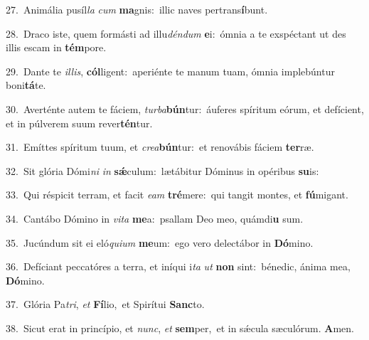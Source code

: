 {\numbfont\textcolor{\numbcolor}{27.}}~Animália pusíl\textit{la} \textit{cum} \textbf{ma}\-gnis:~\star illic naves pertrans\-\textbf{í}\-bunt.\par
{\numbfont\textcolor{\numbcolor}{28.}}~Draco iste, quem formásti ad illu\-\textit{dén}\-\textit{dum} \textbf{e}\-i:~\star ómnia a te exspéctant ut des illis escam in \textbf{tém}\-pore.\par
{\numbfont\textcolor{\numbcolor}{29.}}~Dante te \textit{il}\-\textit{lis}, \textbf{cól}\-ligent:~\star aperiénte te manum tuam, ómnia implebúntur boni\-\textbf{tá}\-te.\par
{\numbfont\textcolor{\numbcolor}{30.}}~Averténte autem te fáciem, \textit{tur}\-\textit{ba}\textbf{bún}tur:~\star áuferes spíritum eórum, et defícient, et in púlverem suum rever\-\textbf{tén}\-tur.\par
{\numbfont\textcolor{\numbcolor}{31.}}~Emíttes spíritum tuum, et \textit{cre}\-\textit{a}\textbf{bún}tur:~\star et renovábis fáciem \textbf{ter}\-ræ.\par
{\numbfont\textcolor{\numbcolor}{32.}}~Sit glória Dómi\textit{ni} \textit{in} \textbf{sǽ}\-culum:~\star lætábitur Dóminus in opéribus \textbf{su}\-is:\par
{\numbfont\textcolor{\numbcolor}{33.}}~Qui réspicit terram, et facit \textit{e}\-\textit{am} \textbf{tré}\-mere:~\star qui tangit montes, et \textbf{fú}\-migant.\par
{\numbfont\textcolor{\numbcolor}{34.}}~Cantábo Dómino in \textit{vi}\-\textit{ta} \textbf{me}\-a:~\star psallam Deo meo, quámdi\textbf{u} sum.\par
{\numbfont\textcolor{\numbcolor}{35.}}~Jucúndum sit ei eló\-\textit{qui}\-\textit{um} \textbf{me}\-um:~\star ego vero delectábor in \textbf{Dó}\-mino.\par
{\numbfont\textcolor{\numbcolor}{36.}}~Defíciant peccatóres a terra, et iníqui i\textit{ta} \textit{ut} \textbf{non} sint:~\star bénedic, ánima mea, \textbf{Dó}\-mino.\par
{\numbfont\textcolor{\numbcolor}{37.}}~Glória Pa\-\textit{tri}\-, \textit{et} \textbf{Fí}\-lio,~\star et Spirítui \textbf{Sanc}\-to.\par
{\numbfont\textcolor{\numbcolor}{38.}}~Sicut erat in princípio, et \textit{nunc}\-, \textit{et} \textbf{sem}\-per,~\star et in sǽcula sæculórum. \textbf{A}\-men.\par
